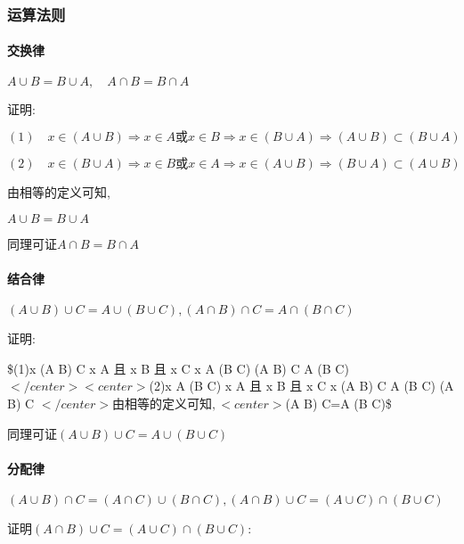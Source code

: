\documentclass[11pt]{article}
\begin{document}
\subsubsection{运算法则}\label{ux8fd0ux7b97ux6cd5ux5219}

\paragraph{交换律}\label{ux4ea4ux6362ux5f8b}

\(A \cup B=B \cup A, \quad A \cap B=B \cap A\)

证明:

\((1)\quad x \in(A \cup B) \Rightarrow x \in A 或 x \in B \Rightarrow x \in(B \cup A) \Rightarrow(A \cup B) \subset(B \cup A)\)

\((2)\quad x \in(B \cup A) \Rightarrow x \in B 或 x \in A \Rightarrow x \in(A \cup B) \Rightarrow(B \cup A) \subset(A \cup B)\)

由相等的定义可知,

\(A \cup B=B \cup A\)

同理可证\(A \cap B=B \cap A\)

\paragraph{结合律}\label{ux7ed3ux5408ux5f8b}

\((A \cup B) \cup C=A \cup(B \cup C), (A \cap B) \cap C=A \cap(B \cap C)\)

证明:

\$(1)\quad x \in(A \cap B) \cap C \Rightarrow x \in  A 且 x \in B 且 x
\in C \Rightarrow x \in A \cap (B \cap C) \Rightarrow (A \cap B) \cap C
\subset A \cap (B \cap C) \(</center> <center>\)(2)\quad x \in A \cap (B
\cap C) \Rightarrow x \in  A 且 x \in B 且 x \in C \Rightarrow x \in (A
\cap B) \cap C \Rightarrow A \cap (B \cap C) \subset (A \cap B) \cap C
\(</center> 由相等的定义可知, <center>\)(A \cap B) \cap C=A \cap(B
\cap C)\$

同理可证\((A \cup B) \cup C=A \cup(B \cup C)\)

\paragraph{分配律}\label{ux5206ux914dux5f8b}

\((A \cup B) \cap C=(A \cap C) \cup(B \cap C), (A \cap B) \cup C=(A \cup C) \cap(B \cup C)\)

证明\((A \cap B) \cup C=(A \cup C) \cap(B \cup C)\):
\end{document}
